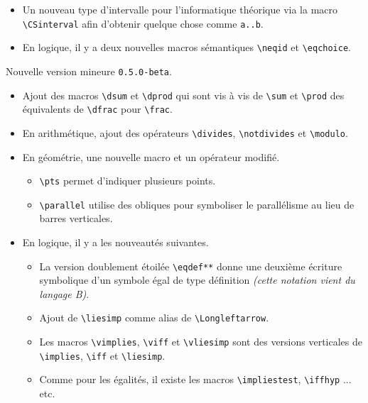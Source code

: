\documentclass[12pt,a4paper]{article}
\begin{document}
\begin{description}[leftmargin=1em]
\begin{itemize}
        \item Un nouveau type d'intervalle pour l'informatique théorique via la macro \verb+\CSinterval+ afin d'obtenir quelque chose comme \verb+a..b+.

        \item En logique, il y a deux nouvelles macros sémantiques \verb+\neqid+ et \verb+\eqchoice+.
    \end{itemize}



    \item[2019-09-27] Nouvelle version mineure \verb+0.5.0-beta+.
    \begin{itemize}
        \item Ajout des macros \verb+\dsum+ et \verb+\dprod+ qui sont vis à vis de \verb+\sum+ et \verb+\prod+ des équivalents de \verb+\dfrac+ pour \verb+\frac+.

        \item En arithmétique, ajout des opérateurs \verb+\divides+, \verb+\notdivides+ et \verb+\modulo+.

        \item En géométrie, une nouvelle macro et un opérateur modifié.
        \begin{itemize}
            \item \verb+\pts+ permet d'indiquer plusieurs points.

            \item \verb+\parallel+ utilise des obliques pour symboliser le parallélisme au lieu de barres verticales.
        \end{itemize}

        \item En logique, il y a les nouveautés suivantes.
        \begin{itemize}
            \item La version doublement étoilée \verb+\eqdef**+ donne une deuxième écriture symbolique d'un symbole égal de type définition \emph{(cette notation vient du langage B)}.

            \item Ajout de \verb+\liesimp+ comme alias de \verb+\Longleftarrow+.

            \item Les macros \verb+\vimplies+, \verb+\viff+ et \verb+\vliesimp+ sont des versions verticales de \verb+\implies+, \verb+\iff+ et \verb+\liesimp+.

            \item Comme pour les égalités, il existe les macros \verb+\impliestest+, \verb+\iffhyp+ ... etc.
        \end{itemize}
    \end{itemize}


\end{description}
\end{document}

